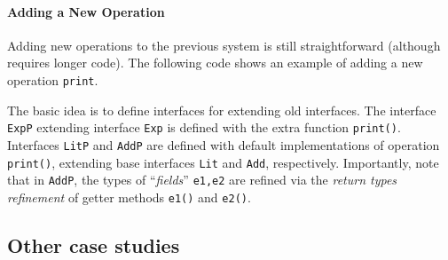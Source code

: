 

\paragraph{\textbf{Adding a New Operation}}
Adding new operations to the previous system is still straightforward (although
requires longer code). The following code shows an example of adding a new
operation \texttt{print}. 


The basic idea is to define interfaces for extending old interfaces.  The
interface \texttt{ExpP} extending interface \texttt{Exp} is defined with the
extra function \texttt{print()}. Interfaces \texttt{LitP} and \texttt{AddP} are
defined with default implementations of operation \texttt{print()}, extending
base interfaces \texttt{Lit} and \texttt{Add}, respectively. Importantly, note
that in \texttt{AddP}, the types of ``\emph{fields}'' \texttt{e1,e2} are refined via
the \emph{return types refinement} of getter methods \texttt{e1()} and
\texttt{e2()}. 

\subsection{Other case studies}
